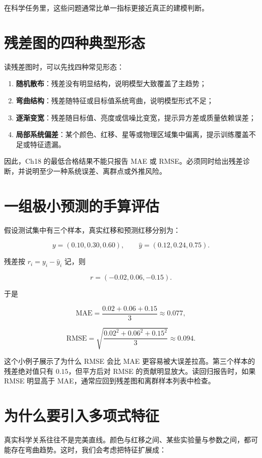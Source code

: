 在科学任务里，这些问题通常比单一指标更接近真正的建模判断。

\section{残差图的四种典型形态}

读残差图时，可以先找四种常见形态：

\begin{enumerate}
    \item \textbf{随机散布}：残差没有明显结构，说明模型大致覆盖了主趋势；
    \item \textbf{弯曲结构}：残差随特征或目标值系统弯曲，说明模型形式不足；
    \item \textbf{逐渐变宽}：残差随目标值、亮度或信噪比变宽，提示异方差或质量依赖误差；
    \item \textbf{局部系统偏差}：某个颜色、红移、星等或物理区域集中偏离，提示训练覆盖不足或特征遗漏。
\end{enumerate}

因此，Ch18 的最低合格结果不能只报告 MAE 或 RMSE。必须同时给出残差诊断，并说明至少一种系统误差、离群点或外推风险。

\section{一组极小预测的手算评估}

假设测试集中有三个样本，真实红移和预测红移分别为：

\[
y=(0.10,0.30,0.60), \qquad
\hat{y}=(0.12,0.24,0.75).
\]

残差按 $r_i=y_i-\hat{y}_i$ 记，则

\[
r=(-0.02,0.06,-0.15).
\]

于是

\[
\mathrm{MAE}=\frac{0.02+0.06+0.15}{3}\approx 0.077,
\]

\[
\mathrm{RMSE}=
\sqrt{\frac{0.02^2+0.06^2+0.15^2}{3}}
\approx 0.094.
\]

这个小例子展示了为什么 RMSE 会比 MAE 更容易被大误差拉高。第三个样本的残差绝对值只有 $0.15$，但平方后对 RMSE 的贡献明显放大。读回归报告时，如果 RMSE 明显高于 MAE，通常应回到残差图和离群样本列表中检查。

\section{为什么要引入多项式特征}

真实科学关系往往不是完美直线。颜色与红移之间、某些实验量与参数之间，都可能存在弯曲趋势。这时，我们会考虑把特征扩展成：


